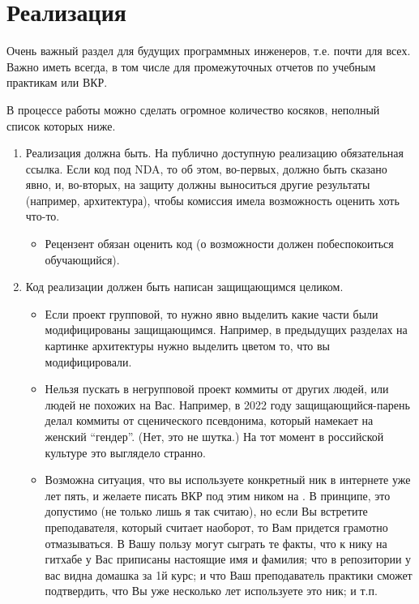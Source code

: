 
\section{Реализация}
Очень важный раздел для будущих программных инженеров, т.е. почти для всех. Важно иметь всегда, в том числе для промежуточных отчетов по учебным практикам или ВКР.

В процессе работы можно сделать огромное количество косяков, неполный список которых ниже.

\begin{enumerate}
  \item Реализация должна быть. На публично доступную реализацию обязательная ссылка. Если код под \textsc{NDA}, то об этом, во-первых, должно быть сказано явно, и, во-вторых, на защиту должны выно\-ситься другие результаты (например, архитектура), чтобы комис\-сия имела возможность оценить хоть что-то.
        \begin{itemize}
          \item  Рецензент обязан оценить код (о возможности должен побеспо\-коиться обучающийся).
        \end{itemize}
  \item Код реализации должен быть написан защищающимся целиком.
        \begin{itemize}
          \item  Если проект групповой, то нужно явно выделить какие части были модифицированы защищающимся. Например, в преды\-дущих разделах на картинке архитектуры нужно выделить цветом то, что вы модифицировали.
          \item Нельзя пускать в негрупповой проект коммиты от других людей, или людей не похожих на Вас. Например, в 2022 году защищающийся-парень делал коммиты от сценического псев\-донима, который намекает на женский ``гендер''. (Нет, это не шутка.) На тот момент в российской культуре это выглядело странно.
          \item Возможна ситуация, что вы используете конкретный ник в интернете уже лет пять, и желаете писать ВКР под этим ником на \GitHub{}. В принципе, это допустимо (не только лишь я так считаю), но если Вы встретите преподавателя, который считает наоборот, то Вам придется грамотно отмазы\-ваться. В Вашу пользу могут сыграть те факты, что к нику на гитхабе у Вас приписаны настоящие имя и фамилия; что в репозитории у вас видна домашка за 1й курс; и что Ваш преподаватель практики сможет подтвердить, что Вы уже несколько лет используете это ник; и т.п.

\end{itemize}
\end{enumerate}
